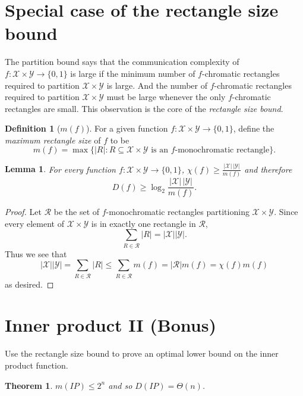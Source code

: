 \documentclass[11pt]{amsart}
\theoremstyle{plain}
\newtheorem{theorem}{Theorem}
\newtheorem{lemma}{Lemma}
\theoremstyle{definition}
\newtheorem{definition}{Definition}
\theoremstyle{plain}
\newcommand{\calX}{\mathcal{X}}
\newcommand{\calY}{\mathcal{Y}}
\begin{document}
\newpage \section{Special case of the rectangle size bound}

The partition bound says that the communication complexity of $f : \calX \times \calY \to \{0,1\}$ is large if the minimum number of $f$-chromatic rectangles required to partition $\calX \times \calY$ is large. And the number of $f$-chromatic rectangles required to partition $\calX \times \calY$ must be large whenever the only $f$-chromatic rectangles are small. This observation is the core of the \emph{rectangle size bound}.

\begin{definition}[$m(f)$]
For a given function $f : \calX \times \calY \to \{0,1\}$, define the \emph{maximum rectangle size} of $f$ to be
\[
m(f) = \max \{ |R| : R \subseteq \calX \times \calY \mbox{ is an $f$-monochromatic rectangle} \}.
\]
\end{definition}


\begin{lemma}
For every function $f : \calX \times \calY \to \{0,1\}$, $\chi(f) \ge \frac{|\calX| \, |\calY|}{m(f)}$ and therefore
\[
D(f) \ge \log_2 \frac{|\calX| \, |\calY|}{m(f)}.
\]
\end{lemma}

\begin{proof}
Let $\mathcal{R}$ be the set of $f$-monochromatic rectangles partitioning $\mathcal{X}\times \mathcal{Y}$. Since every element of $\mathcal{X}\times\mathcal{Y}$ is in exactly one rectangle in $\mathcal{R}$,
$$\sum_{R \in \mathcal{R}} |R| = |\mathcal{X}||\mathcal{Y}|.$$
Thus we see that
$$|\mathcal{X}||\mathcal{Y}| = \sum_{R \in \mathcal{R}} |R| \le \sum_{R \in \mathcal{R}} m(f) = |\mathcal{R}|m(f) = \chi(f)m(f)$$
as desired.
\end{proof}



\newpage \section{Inner product II (Bonus)}

Use the rectangle size bound to prove an optimal lower bound on the inner product function.

\begin{theorem}
$m(IP) \le 2^{n}$ and so $D(IP) = \Theta(n)$.
\end{theorem}
\end{document}
